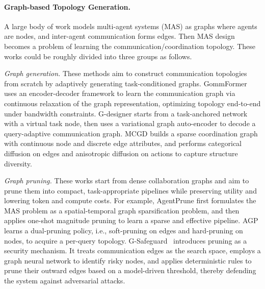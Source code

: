 \paragraph{Graph-based Topology Generation.} 
A large body of work models multi-agent systems (MAS) as graphs where agents are nodes, and inter-agent communication forms edges.  Then MAS design becomes a problem of learning the communication/coordination topology. These works could be roughly divided into three groups as follows. 

\emph{Graph generation.}
These methods aim to construct communication topologies from scratch by adaptively generating task-conditioned graphs. GommFormer \cite{hu2024learning} uses an encoder-decoder framework to learn the communication graph via continuous relaxation of the graph representation, optimizing topology end-to-end under bandwidth constraints. G-designer \cite{zhang2024g} starts from a task-anchored network with a virtual task node, then uses a variational graph auto-encoder to decode a query-adaptive communication graph. MCGD \cite{zenggraph} builds a sparse coordination graph with continuous node and discrete edge attributes, and performs categorical diffusion on edges and anisotropic diffusion on actions to capture structure diversity.

\emph{Graph pruning.}
These works start from dense collaboration graphs and aim to prune them into compact, task-appropriate pipelines while preserving utility and lowering token and compute costs.  For example, AgentPrune \cite{zhang2024cut} first formulates the MAS problem as a spatial-temporal graph sparsification problem, and then applies one-shot magnitude pruning to learn a sparse and effective pipeline. AGP \cite{li2025adaptive} learns a dual-pruning policy, i.e., soft-pruning on edges and hard-pruning on nodes, to acquire a per-query topology. G-Safeguard~\cite{wang2025g} introduces pruning as a security mechanism. It treats communication edges as the search space, employs a graph neural network to identify risky nodes, and applies deterministic rules to prune their outward edges based on a model-driven threshold, thereby defending the system against adversarial attacks. 

